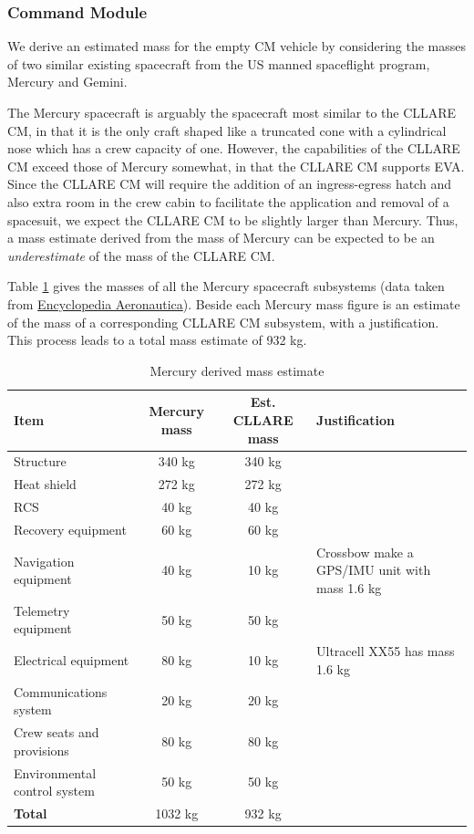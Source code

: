 \documentclass{report}
\begin{document}
\subsubsection{Command Module}

We derive an estimated mass for the empty CM vehicle by considering the masses of two similar existing spacecraft from the US manned spaceflight program, Mercury and Gemini.

The Mercury spacecraft is arguably the spacecraft most similar to the CLLARE CM, in that it is the only craft shaped like a truncated cone with a cylindrical nose which has a crew capacity of one.  However, the capabilities of the CLLARE CM exceed those of Mercury somewhat, in that the CLLARE CM supports EVA.  Since the CLLARE CM will require the addition of an ingress-egress hatch and also extra room in the crew cabin to facilitate the application and removal of a spacesuit, we expect the CLLARE CM to be slightly larger than Mercury.  Thus, a mass estimate derived from the mass of Mercury can be expected to be an \emph{underestimate} of the mass of the CLLARE CM.

Table \ref{tab:mercurymass} gives the masses of all the Mercury spacecraft subsystems (data taken from \href{http://www.astronautix.com/craft/mercury.htm}{Encyclopedia Aeronautica}).  Beside each Mercury mass figure is an estimate of the mass of a corresponding CLLARE CM subsystem, with a justification.  This process leads to a total mass estimate of 932 kg.
 
\begin{table}
\centering
\begin{tabular}{|l|c|c|l|}
\hline
Item	& Mercury mass & Est. CLLARE mass & Justification \\
\hline \hline
Structure		& 340 kg	& 340 kg & \\
Heat shield		& 272 kg	& 272 kg & \\
RCS			& 40 kg		& 40 kg & \\
Recovery equipment	& 60 kg		& 60 kg & \\
Navigation equipment	& 40 kg		& 10 kg & Crossbow make a GPS/IMU unit with mass 1.6 kg \\
Telemetry equipment	& 50 kg		& 50 kg & \\
Electrical equipment	& 80 kg		& 10 kg & Ultracell XX55 has mass 1.6 kg \\
Communications system	& 20 kg		& 20 kg & \\
Crew seats and provisions & 80 kg	& 80 kg & \\
Environmental control system	& 50 kg		& 50 kg & \\
\hline \hline
\textbf{Total}	& 1032 kg & 932 kg	& \\
\hline
\end{tabular}
\caption{Mercury derived mass estimate}
\label{tab:mercurymass}
\end{table} 
\end{document}

